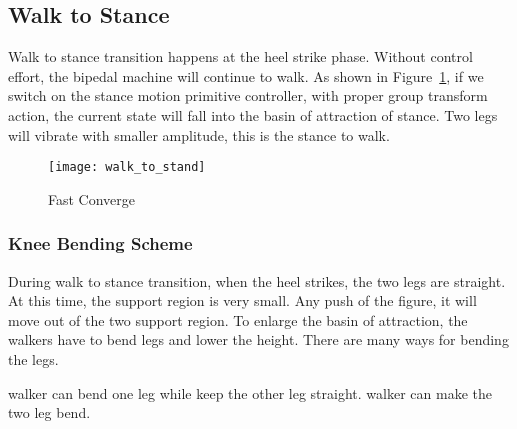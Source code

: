 \subsection{Walk to Stance}
Walk to stance transition happens at the heel strike phase.
Without control effort, the bipedal machine will continue to walk.
As shown in Figure~\ref{fig:walksstance},
if we switch on the stance motion primitive controller, with proper group transform action, the current state will fall into the basin of attraction of stance.
Two legs will vibrate with smaller amplitude, this is the stance to walk.

\begin{figure}[!htbp]
  \begin{center}
    \texttt{[image: walk\_to\_stand]}
    \caption{Fast Converge}
    \label{fig:walksstance}
	\end{center}
\end{figure}







\subsubsection*{Knee Bending Scheme}
During walk to stance transition, when the heel strikes, the two legs are straight. 
At this time, the support region is very small.
Any push of the figure, it will move out of the two support region.
To enlarge the basin of attraction, the walkers have to bend legs and lower the height.
There are many ways for bending the legs.


\begin{itemize}
		walker can bend one leg while keep the other leg straight.
		walker can make the two leg bend.
\end{itemize}

